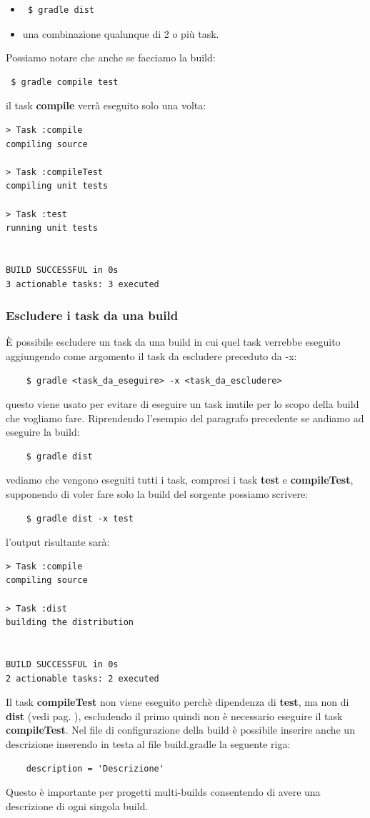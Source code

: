 \documentclass{article}
\begin{document}
\begin{flushleft}
\begin{itemize}
    \item \begin{verbatim} $ gradle dist \end{verbatim}
    \item una combinazione qualunque di 2 o più task.
\end{itemize}
Possiamo notare che anche se facciamo la build: \begin{verbatim} $ gradle compile test \end{verbatim} il task \textbf{compile} verrà eseguito solo una volta:
\begin{verbatim}
> Task :compile 
compiling source

> Task :compileTest 
compiling unit tests

> Task :test 
running unit tests


BUILD SUCCESSFUL in 0s
3 actionable tasks: 3 executed
\end{verbatim}
\subsubsection{Escludere i task da una build}
È possibile escludere un task da una build in cui quel task verrebbe eseguito aggiungendo come argomento il task da escludere preceduto da -x:
\begin{verbatim}
    $ gradle <task_da_eseguire> -x <task_da_escludere>
\end{verbatim}
questo viene usato per evitare di eseguire un task inutile per lo scopo della build che vogliamo fare. Riprendendo l'esempio del paragrafo precedente se andiamo ad eseguire la build:
\begin{verbatim}
    $ gradle dist    
\end{verbatim}
vediamo che vengono eseguiti tutti i task, compresi i task \textbf{test} e \textbf{compileTest}, supponendo di voler fare solo la build del sorgente possiamo scrivere:
\begin{verbatim}
    $ gradle dist -x test
\end{verbatim}
l'output risultante sarà:
\begin{verbatim}
> Task :compile 
compiling source

> Task :dist 
building the distribution


BUILD SUCCESSFUL in 0s
2 actionable tasks: 2 executed
\end{verbatim}
Il task \textbf{compileTest} non viene eseguito perchè dipendenza di \textbf{test}, ma non di \textbf{dist} (vedi pag. \pageref{taskdip}), escludendo il primo quindi non è necessario eseguire il task \textbf{compileTest}. Nel file di configurazione della build è possibile inserire anche un descrizione inserendo in testa al file build.gradle la seguente riga:
\begin{verbatim}
    description = 'Descrizione'
\end{verbatim}
Questo è importante per progetti multi-builds consentendo di avere una descrizione di ogni singola build.


\end{flushleft}
\end{document}

